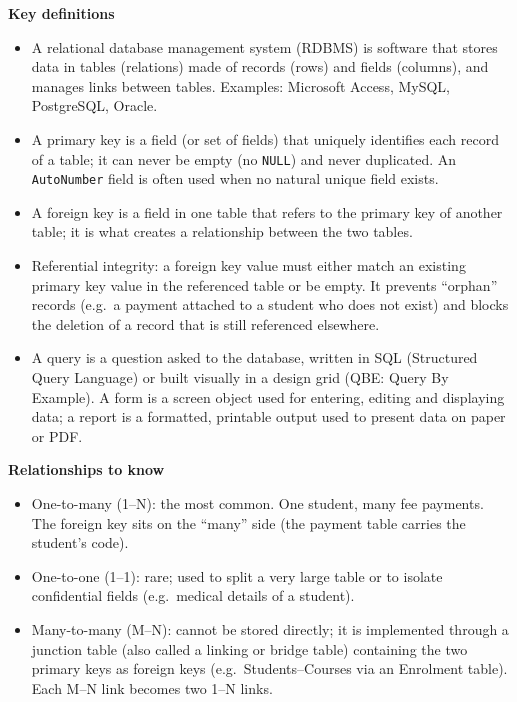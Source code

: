 \documentclass[11pt]{article}
\newcommand{\cle}[1]{{\popxbold\color{popdark}#1}}
\begin{document}
\begin{bilan}
\textbf{Key definitions}
\begin{itemize}
\item A \cle{relational database management system} (RDBMS) is software that stores data in \cle{tables} (relations) made of \cle{records} (rows) and \cle{fields} (columns), and manages links between tables. Examples: Microsoft Access, MySQL, PostgreSQL, Oracle.
\item A \cle{primary key} is a field (or set of fields) that uniquely identifies each record of a table; it can never be empty (no \texttt{NULL}) and never duplicated. An \texttt{AutoNumber} field is often used when no natural unique field exists.
\item A \cle{foreign key} is a field in one table that refers to the primary key of another table; it is what creates a \cle{relationship} between the two tables.
\item \cle{Referential integrity}: a foreign key value must either match an existing primary key value in the referenced table or be empty. It prevents ``orphan'' records (e.g.\ a payment attached to a student who does not exist) and blocks the deletion of a record that is still referenced elsewhere.
\item A \cle{query} is a question asked to the database, written in \cle{SQL} (Structured Query Language) or built visually in a design grid (QBE: Query By Example). A \cle{form} is a screen object used for entering, editing and displaying data; a \cle{report} is a formatted, printable output used to present data on paper or PDF.
\end{itemize}

\textbf{Relationships to know}
\begin{itemize}
\item \cle{One-to-many} (1--N): the most common. One student, many fee payments. The foreign key sits on the ``many'' side (the payment table carries the student's code).
\item \cle{One-to-one} (1--1): rare; used to split a very large table or to isolate confidential fields (e.g.\ medical details of a student).
\item \cle{Many-to-many} (M--N): cannot be stored directly; it is implemented through a \cle{junction table} (also called a linking or bridge table) containing the two primary keys as foreign keys (e.g.\ Students--Courses via an Enrolment table). Each M--N link becomes two 1--N links.
\end{itemize}


\end{bilan}
\end{document}
